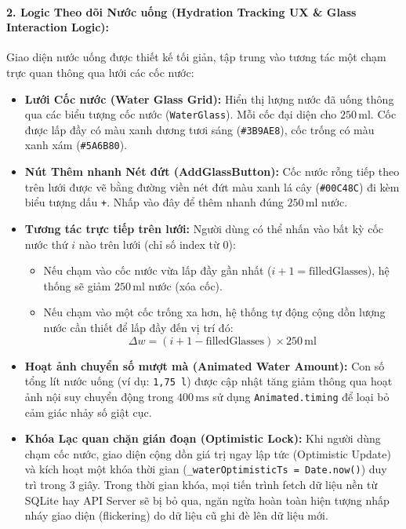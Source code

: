 \documentclass[12pt,a4paper]{article}
\begin{document}
\paragraph{2. Logic Theo dõi Nước uống (Hydration Tracking UX \& Glass Interaction Logic):}
Giao diện nước uống được thiết kế tối giản, tập trung vào tương tác một chạm trực quan thông qua lưới các cốc nước:
\begin{itemize}
    \item \textbf{Lưới Cốc nước (Water Glass Grid):} Hiển thị lượng nước đã uống thông qua các biểu tượng cốc nước (\texttt{WaterGlass}). Mỗi cốc đại diện cho $250\,\text{ml}$. Cốc được lấp đầy có màu xanh dương tươi sáng (\texttt{\#3B9AE8}), cốc trống có màu xanh xám (\texttt{\#5A6B80}).
    \item \textbf{Nút Thêm nhanh Nét đứt (AddGlassButton):} Cốc nước rỗng tiếp theo trên lưới được vẽ bằng đường viền nét đứt màu xanh lá cây (\texttt{\#00C48C}) đi kèm biểu tượng dấu \texttt{+}. Nhấp vào đây để thêm nhanh đúng $250\,\text{ml}$ nước.
    \item \textbf{Tương tác trực tiếp trên lưới:} Người dùng có thể nhấn vào bất kỳ cốc nước thứ $i$ nào trên lưới (chỉ số index từ 0):
    \begin{itemize}
        \item Nếu chạm vào cốc nước vừa lấp đầy gần nhất ($i + 1 = \text{filledGlasses}$), hệ thống sẽ giảm $250\,\text{ml}$ nước (xóa cốc).
        \item Nếu chạm vào một cốc trống xa hơn, hệ thống tự động cộng dồn lượng nước cần thiết để lấp đầy đến vị trí đó:
        \begin{equation}
            \Delta w = (i + 1 - \text{filledGlasses}) \times 250\,\text{ml}
        \end{equation}
    \end{itemize}
    \item \textbf{Hoạt ảnh chuyển số mượt mà (Animated Water Amount):} Con số tổng lít nước uống (ví dụ: \texttt{1,75 l}) được cập nhật tăng giảm thông qua hoạt ảnh nội suy chuyển động trong $400\,\text{ms}$ sử dụng \texttt{Animated.timing} để loại bỏ cảm giác nhảy số giật cục.
    \item \textbf{Khóa Lạc quan chặn gián đoạn (Optimistic Lock):} Khi người dùng chạm cốc nước, giao diện cộng dồn giá trị ngay lập tức (Optimistic Update) và kích hoạt một khóa thời gian (\texttt{\_waterOptimisticTs = Date.now()}) duy trì trong 3 giây. Trong thời gian khóa, mọi tiến trình fetch dữ liệu nền từ SQLite hay API Server sẽ bị bỏ qua, ngăn ngừa hoàn toàn hiện tượng nhấp nháy giao diện (flickering) do dữ liệu cũ ghi đè lên dữ liệu mới.
\end{itemize}
\end{document}
